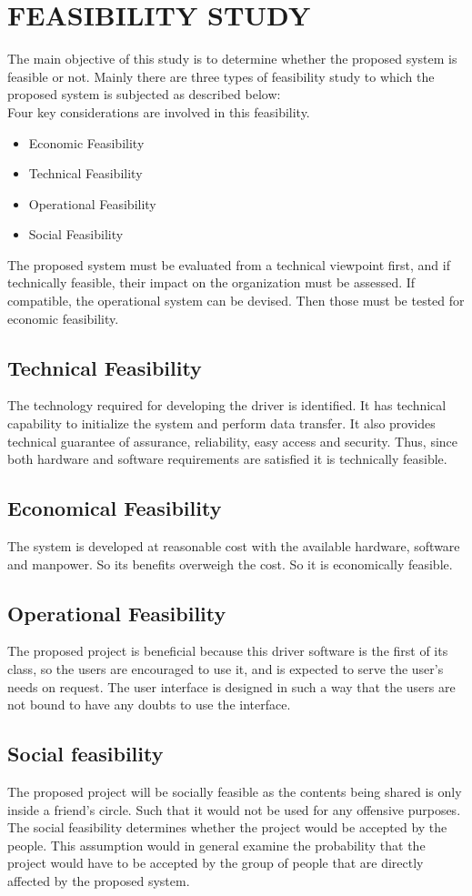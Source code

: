 \documentclass[12pt,a4paper,oneside]{report}
\begin{document}
\section{FEASIBILITY STUDY}
The main objective of this study is to determine whether the proposed system is feasible or not. Mainly there are three types of feasibility study to which the proposed system is subjected as described below:\\
Four key considerations are involved in this feasibility.
\begin{itemize}
\item Economic Feasibility 
\item Technical Feasibility
\item Operational Feasibility 
\item Social Feasibility
\end{itemize}
 
The proposed system must be evaluated from a technical viewpoint first, and if technically feasible, their impact on the organization must be assessed. If compatible, the operational system can be devised. Then those must be tested for economic feasibility.
\subsection{Technical Feasibility}
	The technology required for developing the driver is identified. It has technical capability to initialize the system and perform data transfer. It also provides technical guarantee of assurance, reliability, easy access and security. Thus, since both hardware and software requirements are satisfied it is technically feasible. 
\subsection{Economical Feasibility}
	The system is developed at reasonable cost with the available hardware, software and manpower. So its benefits overweigh the cost. So it is economically feasible. 
\subsection{Operational Feasibility}
The proposed project is beneficial because this driver software is the first of its class, so the users are encouraged to use it, and is expected to serve the user's needs on request. The user interface is designed in such a way that the users are not bound to have any doubts to use the interface.
\subsection{Social feasibility}
The proposed project will be socially feasible as the contents being shared is only inside a friend's circle. Such that it would not be used for any offensive purposes. The social feasibility determines whether the project would be accepted by the people. This assumption would in general examine the probability that the project would have to be accepted by the group of people that are directly affected by the proposed system.
\end{document}
